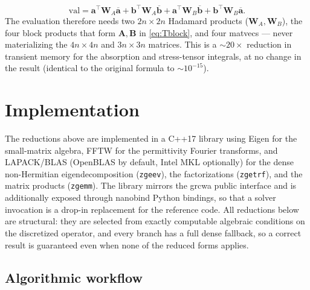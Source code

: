 \documentclass[11pt]{article}
\theoremstyle{remark}
\newcommand{\fa}{\mathbf{a}}
\newcommand{\fb}{\mathbf{b}}
\begin{document}
\begin{equation}
\mathrm{val}=\fa^{\top}\mathbf{W}_A\overline{\fa}+\fb^{\top}\mathbf{W}_A\overline{\fb}
+\fa^{\top}\mathbf{W}_B\overline{\fb}+\fb^{\top}\mathbf{W}_B\overline{\fa}.
\label{eq:val}
\end{equation}
The evaluation therefore needs two $2n\times2n$ Hadamard products
($\mathbf{W}_A,\mathbf{W}_B$), the four block products that form
$\mathbf{A},\mathbf{B}$ in \eqref{eq:Tblock}, and four matvecs --- never
materializing the $4n\times4n$ and $3n\times3n$ matrices. This is a
$\sim20\times$ reduction in transient memory for the absorption and
stress-tensor integrals, at no change in the result (identical to the original
formula to $\sim10^{-15}$).

\section{Implementation}
\label{sec:impl}

The reductions above are implemented in a C++17 library using Eigen for the
small-matrix algebra, FFTW for the permittivity Fourier transforms, and
LAPACK/BLAS (OpenBLAS by default, Intel MKL optionally) for the dense
non-Hermitian eigendecomposition (\texttt{zgeev}), the factorizations
(\texttt{zgetrf}), and the matrix products (\texttt{zgemm}).  The library
mirrors the grcwa public interface and is additionally exposed through nanobind
Python bindings, so that a solver invocation is a drop-in replacement for the
reference code.  All reductions below are structural: they are selected from
exactly computable algebraic conditions on the discretized operator, and every
branch has a full dense fallback, so a correct result is guaranteed even when
none of the reduced forms applies.

\subsection{Algorithmic workflow}
\label{sec:workflow}
\end{document}
